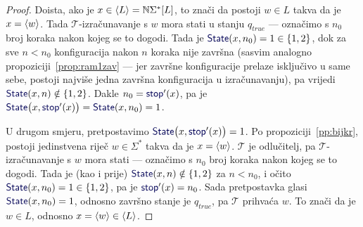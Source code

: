 \begin{proof}
Doista, ako je $x\in\langle L\rangle={\mathbb N}\Sigma^*[L]$, to znači da postoji $w\in L$ takva da je $x=\langle w\rangle$. Tada $\mathcal T$-izračunavanje s $w$ mora stati u stanju $q_\mathit{true}$ --- označimo s $n_0$ broj koraka nakon kojeg se to dogodi. Tada je $\f{State}(x,n_0)=1\in\{1,2\}$, dok za sve $n<n_0$ konfiguracija nakon $n$ koraka nije završna (sasvim analogno propoziciji~\ref{prop:ram1zav} --- jer završne konfiguracije prelaze isključivo u same sebe, postoji najviše jedna završna konfiguracija u izračunavanju), pa vrijedi $\f{State}(x,n)\notin\{1,2\}$. Dakle $n_0=\f{stop}'(x)$, pa je $\f{State}\bigl(x,\f{stop}'(x)\bigr)=\f{State}(x,n_0)=1$.

U drugom smjeru, pretpostavimo $\f{State}\bigl(x,\f{stop}'(x)\bigr)=1$. Po propoziciji~\ref{pp:bijkr}, postoji jedinstvena riječ $w\in\Sigma^*$ takva da je $x=\langle w\rangle$. $\mathcal T$ je odlučitelj, pa $\mathcal T$-izračunavanje s $w$ mora stati --- označimo s $n_0$ broj koraka nakon kojeg se to dogodi. Tada je (kao i prije) $\f{State}(x,n)\notin\{1,2\}$ za $n<n_0$, i očito $\f{State}(x,n_0)=1\in\{1,2\}$, pa je $\f{stop}'(x)=n_0$. Sada pretpostavka glasi $\f{State}(x,n_0)=1$, odnosno završno stanje je $q_{\mathit{true}}$, pa $\mathcal T$ prihvaća $w$. To znači da je $w\in L$, odnosno $x=\langle w\rangle\in\langle L\rangle$.
\end{proof}


